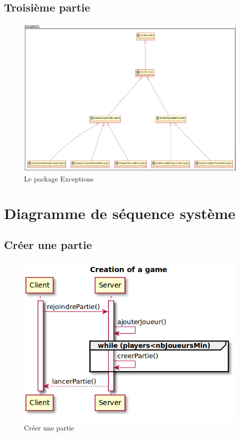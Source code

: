 	\subsection{Troisième partie}
		\vspace{10mm}
		\begin{figure}[!h]
			\centering
			\includegraphics[scale=0.4]{images/DP3.png}
			\caption{Le package Exceptions}
		\end{figure}

\newpage
\section{Diagramme de séquence système}
	\subsection{Créer une partie}
		\vspace{10mm}
		\begin{figure}[!h]
			\centering
			\includegraphics[scale=0.5]{images/DSSCreate.png}
			\caption{Créer une partie}
		\end{figure}


